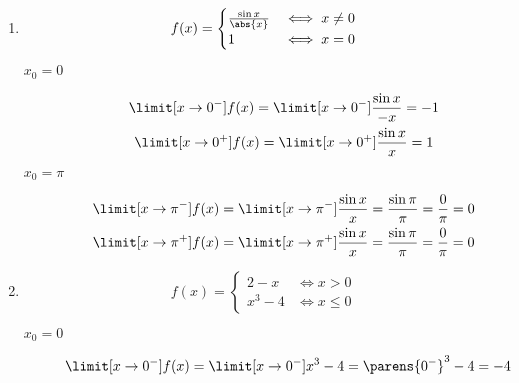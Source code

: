 \begin{enumerate}[label={\alph*)}]
    \item
        \begin{equation*}
            f(x) = \begin{cases}
                \frac{\sin{x}}{\abs{x}} & \iff x \neq 0\\
                1 & \iff x = 0
            \end{cases}
        \end{equation*}
        \begin{description}
            \item[\(x_0 = 0\)]
                \begin{gather*}
                    \limit[x \to 0^-] f(x)
                        = \limit[x \to 0^{-}] \frac{\sin x}{-x}
                        = -1\\
                    \limit[x \to 0^+] f(x)
                        = \limit[x \to 0^+] \frac{\sin x}{x}
                        = 1
                \end{gather*}
            \item[\(x_0 = \pi\)]
                \begin{gather*}
                    \limit[x \to \pi^-] f(x)
                        = \limit[x \to \pi^-] \frac{\sin x}{x}
                        = \frac{\sin \pi}{\pi}
                        = \frac{0}{\pi}
                        = 0\\
                    \limit[x \to \pi^+] f(x)
                        = \limit[x \to \pi^+] \frac{\sin x}{x}
                        = \frac{\sin \pi}{\pi}
                        = \frac{0}{\pi}
                        = 0
                \end{gather*}
        \end{description}
    \item
        \begin{equation*}
            f(x) = \begin{cases}
                2 - x & \iff x > 0\\
                x^3 - 4 & \iff x \leq 0
            \end{cases}
        \end{equation*}
        \begin{description}
            \item[\(x_0 = 0\)]
                \begin{gather*}
                    \limit[x \to 0^-] f(x)
                        = \limit[x \to 0^-] x^3 - 4
                        = \parens{0^-}^3 - 4
                        = -4\\

\end{gather*}
\end{description}
\end{enumerate}
